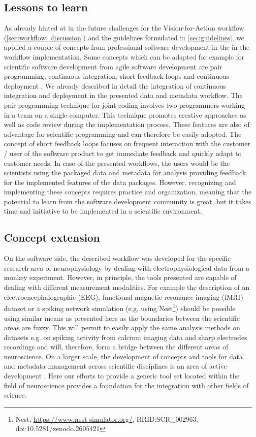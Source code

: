 \subsection{Lessons to learn}
As already hinted at in the future challenges for the Vision-for-Action workflow (\cref{sec:workflow_discussion}) and the guidelines formulated in \cref{sec:guidelines}, we applied a couple of concepts from professional software development in the in the workflow implementation. Some concepts which can be adapted for example for scientific software development from agile software development are pair programming, continuous integration, short feedback loops and continuous deployment \citep{Shore_2007}. We already described in detail the integration of continuous integration and deployment in the presented data and metadata workflow. The pair programming technique for joint coding involves two programmers working in a team on a single computer. This technique promotes creative approaches as well as code review during the implementation process. These features are also of advantage for scientific programming and can therefore be easily adopted. The concept of short feedback loops focuses on frequent interaction with the customer / user of the software product to get immediate feedback and quickly adapt to customer needs. In case of the presented workflows, the users would be the scientists using the packaged data and metadata for analysis providing feedback for the implemented features of the data packages. However, recognizing and implementing these concepts requires practice and organization, meaning that the potential to learn from the software development community is great, but it takes time and initiative to be implemented in a scientific environment.

\subsection{Concept extension}
On the software side, the described workflow was developed for the specific research area of neurophysiology by dealing with electrophysiological data from a monkey experiment. However, in principle, the tools presented are capable of dealing with different measurement modalities. For example the description of an electroencephalographic (EEG), functional magnetic resonance imaging (fMRI) dataset or a spiking network simulation (e.g. using Nest\footnote{Nest, \url{https://www.nest-simulator.org/}, RRID:SCR\_002963, doi:10.5281/zenodo.2605421}) should be possible using similar means as presented here as the boundaries between the scientific areas are fuzzy. This will permit to easily apply the same analysis methods on datasets e.g. on spiking activity from calcium imaging data and sharp electrodes recordings and will, therefore, form a bridge between the different areas of neuroscience.
On a larger scale, the development of concepts and tools for data and metadata management across scientific disciplines is an area of active development \cite{Amari_2002, Cheung_2009, Nichols_2015}. Here our efforts to provide a generic tool set located within the field of neuroscience provides a foundation for the integration with other fields of science.

